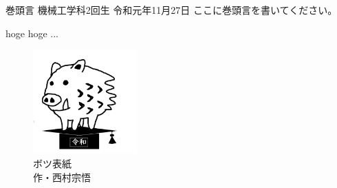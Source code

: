 \documentclass[10pt,b5paper,papersize,dvipdfmx]{jsbook}
\begin{document}
\begin{preface}{巻頭言}
        {機械工学科2回生}
        {}
        {令和元年11月27日}
  ここに巻頭言を書いてください。\par
  hoge hoge ...
\end{preface}


\clearpage
\quad\vfill
\begin{figure}[htb]
  \centering
  \includegraphics[width=40mm]{img/inoshishi.png}
  \caption*{
    \setlength{\baselineskip}{1.2zw}\gtfamily
    ボツ表紙 \\ 作・西村宗悟
  }
  \label{}
\end{figure}
\vfill
\end{document}

